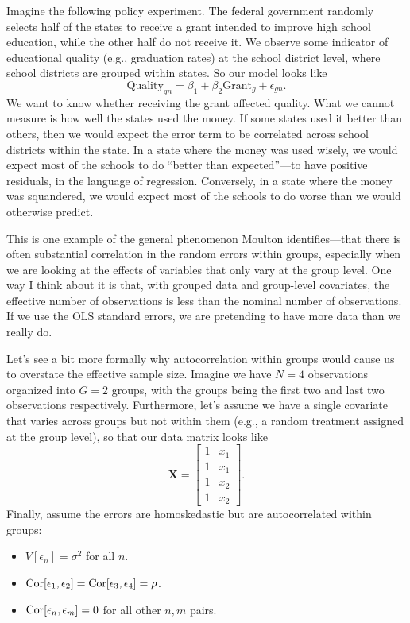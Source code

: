 \documentclass[
  12pt,
  oneside,openany]{book}
\providecommand{\tightlist}{%
  \setlength{\itemsep}{0pt}\setlength{\parskip}{0pt}}
\begin{document}
Imagine the following policy experiment. The federal government randomly selects half of the states to receive a grant intended to improve high school education, while the other half do not receive it. We observe some indicator of educational quality (e.g., graduation rates) at the school district level, where school districts are grouped within states. So our model looks like
\[
\text{Quality}_{gn} = \beta_1 + \beta_2 \text{Grant}_g + \epsilon_{gn}.
\]
We want to know whether receiving the grant affected quality. What we cannot measure is how well the states used the money. If some states used it better than others, then we would expect the error term to be correlated across school districts within the state. In a state where the money was used wisely, we would expect most of the schools to do ``better than expected''---to have positive residuals, in the language of regression. Conversely, in a state where the money was squandered, we would expect most of the schools to do worse than we would otherwise predict.

This is one example of the general phenomenon Moulton \citetext{\citeyear{Moulton:1986kw}; \citeyear{Moulton:1990bl}} identifies---that there is often substantial correlation in the random errors within groups, especially when we are looking at the effects of variables that only vary at the group level. One way I think about it is that, with grouped data and group-level covariates, the effective number of observations is less than the nominal number of observations. If we use the OLS standard errors, we are pretending to have more data than we really do.

Let's see a bit more formally why autocorrelation within groups would cause us to overstate the effective sample size.
Imagine we have \(N = 4\) observations organized into \(G = 2\) groups, with the groups being the first two and last two observations respectively.
Furthermore, let's assume we have a single covariate that varies across groups but not within them (e.g., a random treatment assigned at the group level), so that our data matrix looks like
\[
\mathbf{X} = \begin{bmatrix}
1 & x_1 \\
1 & x_1 \\
1 & x_2 \\
1 & x_2
\end{bmatrix}.
\]
Finally, assume the errors are homoskedastic but are autocorrelated within groups:

\begin{itemize}
\tightlist
\item
  \(V[\epsilon_n] = \sigma^2\) for all \(n\).
\item
  \(\mathop{\rm Cor}\nolimits[\epsilon_1, \epsilon_2] = \mathop{\rm Cor}\nolimits[\epsilon_3, \epsilon_4] = \rho\).
\item
  \(\mathop{\rm Cor}\nolimits[\epsilon_n, \epsilon_m] = 0\) for all other \(n, m\) pairs.
\end{itemize}
\end{document}
